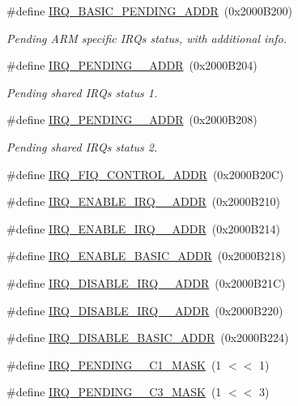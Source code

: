 \begin{DoxyCompactItemize}
\#define \hyperlink{group__Peripherals_ga334b052c50be613285e01548f10ea332}{I\+R\+Q\+\_\+\+B\+A\+S\+I\+C\+\_\+\+P\+E\+N\+D\+I\+N\+G\+\_\+\+A\+D\+DR}~(0x2000\+B200)
\begin{DoxyCompactList}\small\item\em Pending A\+RM specific I\+R\+Qs status, with additional info. \end{DoxyCompactList}\item 
\#define \hyperlink{group__Peripherals_gaf4fff6d032f44ce818e9bcbb4f82baea}{I\+R\+Q\+\_\+\+P\+E\+N\+D\+I\+N\+G\+\_\+\_\+\+A\+D\+DR}~(0x2000\+B204)
\begin{DoxyCompactList}\small\item\em Pending shared I\+R\+Qs status 1. \end{DoxyCompactList}\item 
\#define \hyperlink{group__Peripherals_ga9633641d3c1c1f3c450c35cbe28f0df9}{I\+R\+Q\+\_\+\+P\+E\+N\+D\+I\+N\+G\+\_\+\_\+\+A\+D\+DR}~(0x2000\+B208)
\begin{DoxyCompactList}\small\item\em Pending shared I\+R\+Qs status 2. \end{DoxyCompactList}\item 
\#define \hyperlink{group__Peripherals_ga2f4ae1371340b17ceff2937ef1ab9ca9}{I\+R\+Q\+\_\+\+F\+I\+Q\+\_\+\+C\+O\+N\+T\+R\+O\+L\+\_\+\+A\+D\+DR}~(0x2000\+B20\+C)
\item 
\#define \hyperlink{group__Peripherals_ga26b03ed5270fb1551038352804cadc9f}{I\+R\+Q\+\_\+\+E\+N\+A\+B\+L\+E\+\_\+\+I\+R\+Q\+\_\+\_\+\+A\+D\+DR}~(0x2000\+B210)
\item 
\#define \hyperlink{group__Peripherals_gacc0e8d33bca70be8a8f9e2575fcd9c96}{I\+R\+Q\+\_\+\+E\+N\+A\+B\+L\+E\+\_\+\+I\+R\+Q\+\_\+\_\+\+A\+D\+DR}~(0x2000\+B214)
\item 
\#define \hyperlink{group__Peripherals_gaaf40e96e6950110bf3b14a8408bcfad6}{I\+R\+Q\+\_\+\+E\+N\+A\+B\+L\+E\+\_\+\+B\+A\+S\+I\+C\+\_\+\+A\+D\+DR}~(0x2000\+B218)
\item 
\#define \hyperlink{group__Peripherals_gaa557a70338299ab1f8fcd0862bfebcbd}{I\+R\+Q\+\_\+\+D\+I\+S\+A\+B\+L\+E\+\_\+\+I\+R\+Q\+\_\+\_\+\+A\+D\+DR}~(0x2000\+B21\+C)
\item 
\#define \hyperlink{group__Peripherals_ga22bf9fabec2c703fcce135d5894b79a3}{I\+R\+Q\+\_\+\+D\+I\+S\+A\+B\+L\+E\+\_\+\+I\+R\+Q\+\_\+\_\+\+A\+D\+DR}~(0x2000\+B220)
\item 
\#define \hyperlink{group__Peripherals_ga733b1f250b79a62906eca0763189fc79}{I\+R\+Q\+\_\+\+D\+I\+S\+A\+B\+L\+E\+\_\+\+B\+A\+S\+I\+C\+\_\+\+A\+D\+DR}~(0x2000\+B224)
\item 
\#define \hyperlink{group__Peripherals_ga536add31e36eeec9bbb6506f798d9761}{I\+R\+Q\+\_\+\+P\+E\+N\+D\+I\+N\+G\+\_\+\_\+\+C1\+\_\+\+M\+A\+SK}~(1 $<$$<$ 1)
\item 
\#define \hyperlink{group__Peripherals_ga0ad6222d2e26c8a0a0353842875077d7}{I\+R\+Q\+\_\+\+P\+E\+N\+D\+I\+N\+G\+\_\+\_\+\+C3\+\_\+\+M\+A\+SK}~(1 $<$$<$ 3)
\end{DoxyCompactItemize}
